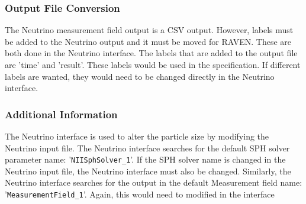 \subsubsection{Output File Conversion}
The Neutrino measurement field output is a CSV output. However, labels must be added to the Neutrino output
and it must be moved for RAVEN. These are both done in the Neutrino interface. The labels that are added to the
output file are 'time' and 'result'. These labels would be used in the  specification.
If different labels are wanted, they would need to be changed directly in the Neutrino interface.

\subsubsection{Additional Information}
The Neutrino interface is used to alter the particle size by modifying the Neutrino input file. The Neutrino interface
searches for the default SPH solver parameter name: '\texttt{NIISphSolver\_1}'. If the SPH solver name is changed in the
Neutrino input file, the Neutrino interface must also be changed. Similarly, the Neutrino interface searches for the
output in the default Measurement field name: '\texttt{MeasurementField\_1}'. Again, this would need to modified in the interface
